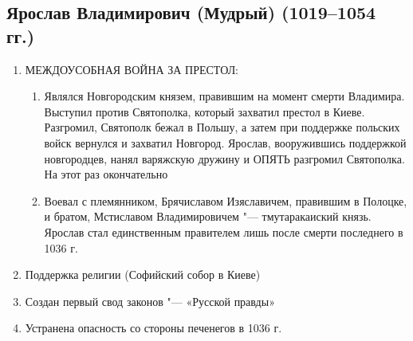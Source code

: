 \subsection{Ярослав Владимирович (Мудрый) (1019--1054 гг.)}

\begin{enumerate}
    \item{ МЕЖДОУСОБНАЯ ВОЙНА ЗА ПРЕСТОЛ:
        \begin{enumerate}
            \item{ Являлся Новгородским князем, правившим на момент смерти Владимира. Выступил против Святополка, который захватил престол в Киеве. Разгромил, Святополк бежал в Польшу, а затем при поддержке польских войск вернулся и захватил Новгород. Ярослав, вооружившись поддержкой новгородцев, нанял варяжскую дружину и ОПЯТЬ разгромил Святополка. На этот раз окончательно}
            \item{ Воевал с племянником, Брячиславом Изяславичем, правившим в Полоцке, и братом, Мстиславом Владимировичем "--- тмутаракаиский князь. Ярослав стал единственным правителем лишь после смерти последнего в 1036 г.}
        \end{enumerate}
    }
    \item{ Поддержка религии (Софийский собор в Киеве)}
    \item{ Создан первый свод законов "--- «Русской правды»}
    \item{ Устранена опасность со стороны печенегов в 1036 г.}
\end{enumerate}
